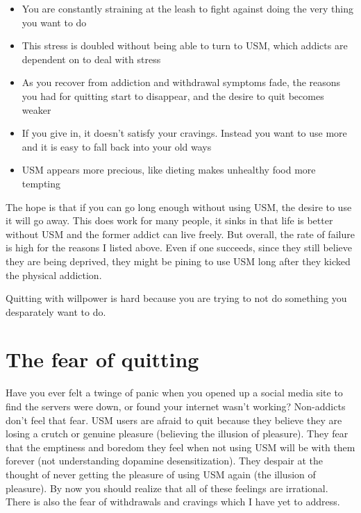 \documentclass[
  openany]{book}
\providecommand{\tightlist}{%
  \setlength{\itemsep}{0pt}\setlength{\parskip}{0pt}}
\newenvironment{rmdnote}{
\color{blue}
\begin{framed}}{\end{framed}}
\begin{document}
\begin{itemize}
\tightlist
\item
  You are constantly straining at the leash to fight against doing the very thing you want to do
\item
  This stress is doubled without being able to turn to USM, which addicts are dependent on to deal with stress
\item
  As you recover from addiction and withdrawal symptoms fade, the reasons you had for quitting start to disappear, and the desire to quit becomes weaker
\item
  If you give in, it doesn't satisfy your cravings. Instead you want to use more and it is easy to fall back into your old ways
\item
  USM appears more precious, like dieting makes unhealthy food more tempting
\end{itemize}

The hope is that if you can go long enough without using USM, the desire to use it will go away. This does work for many people, it sinks in that life is better without USM and the former addict can live freely. But overall, the rate of failure is high for the reasons I listed above. Even if one succeeds, since they still believe they are being deprived, they might be pining to use USM long after they kicked the physical addiction.

\begin{rmdnote}
Quitting with willpower is hard because you are trying to not do something you desparately want to do.

\end{rmdnote}

\section{The fear of quitting}\label{the-fear-of-quitting}

Have you ever felt a twinge of panic when you opened up a social media site to find the servers were down, or found your internet wasn't working? Non-addicts don't feel that fear. USM users are afraid to quit because they believe they are losing a crutch or genuine pleasure (believing the illusion of pleasure). They fear that the emptiness and boredom they feel when not using USM will be with them forever (not understanding dopamine desensitization). They despair at the thought of never getting the pleasure of using USM again (the illusion of pleasure). By now you should realize that all of these feelings are irrational. There is also the fear of withdrawals and cravings which I have yet to address.
\end{document}

